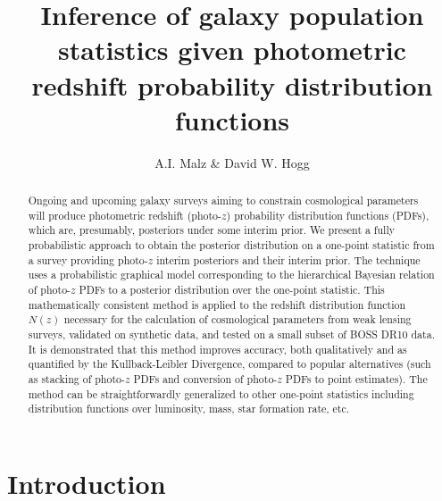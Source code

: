 \documentclass[preprint]{aastex}
\begin{document}
\title{Inference of galaxy population statistics given photometric redshift 
probability distribution functions}

\author{A.I. Malz \& David W. Hogg}


\begin{abstract}
Ongoing and upcoming galaxy surveys aiming to constrain cosmological parameters 
will produce photometric redshift (photo-$z$) probability distribution 
functions (PDFs), which are, presumably, posteriors under some interim prior.  
We present a fully probabilistic approach to obtain the posterior distribution 
on a one-point statistic from a survey providing photo-$z$ interim posteriors 
and their interim prior.  The technique uses a probabilistic graphical model 
corresponding to the hierarchical Bayesian relation of photo-$z$ PDFs to a 
posterior distribution over the one-point statistic.  This mathematically 
consistent method is applied to the redshift distribution function $N(z)$ 
necessary for the calculation of cosmological parameters from weak lensing 
surveys, validated on synthetic data, and tested on a small subset of BOSS DR10 
data.  It is demonstrated that this method improves accuracy, both 
qualitatively and as quantified by the Kullback-Leibler Divergence, compared to 
popular alternatives (such as stacking of photo-$z$ PDFs and conversion of 
photo-$z$ PDFs to point estimates).  The method can be straightforwardly 
generalized to other one-point statistics including distribution functions over 
luminosity, mass, star formation rate, etc.
\end{abstract}


\section{Introduction}
\label{sec:intro}
\end{document}
